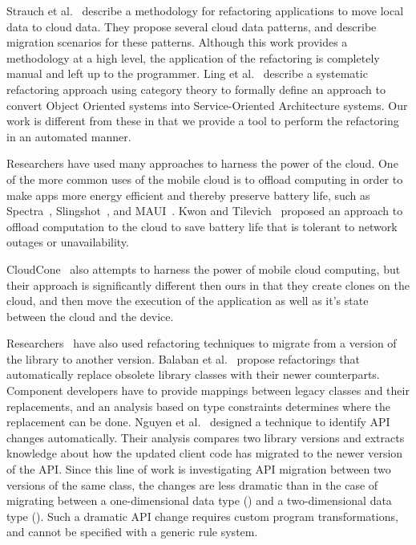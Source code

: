 \documentclass[article]{sigplanconf}
\begin{document}
Strauch et al.~\cite{strauchmigrating} describe a methodology for refactoring applications to move local data to cloud data. They propose several cloud data patterns, and describe migration scenarios for these patterns. Although this work provides a methodology at a high level, the application of the refactoring is completely manual and left up to the programmer. 
Ling et al.~\cite{ling2010refactoring} describe a systematic refactoring approach 
using category theory to formally define an approach to convert Object Oriented systems 
into Service-Oriented Architecture systems. 
Our work is different from these in that we provide a tool to perform the refactoring in an automated manner.

Researchers have used many approaches to harness the power of the cloud.
One of the more common uses of the mobile cloud is to offload computing in order to make apps more energy efficient and thereby preserve battery life, such as Spectra~\cite{flinn2002balancing}, Slingshot~\cite{su2005slingshot}, and MAUI~\cite{cuervo2010maui}.  
Kwon and Tilevich~\cite{kwon2012energy} proposed an approach to offload computation to the cloud to save battery life that is tolerant to network outages or unavailability.

CloudCone~\cite{chun2011clonecloud} also attempts to harness the power of mobile cloud computing, but their approach is significantly different then ours in that they create clones on the cloud, and then move the execution of the application as well as it's state between the cloud and the device.  

Researchers~\cite{BalabanTF05,Nguyen2010} have also used refactoring techniques to migrate from a version of the library to another version. Balaban et al.~\cite{BalabanTF05} propose
refactorings that automatically replace obsolete library classes with their newer counterparts. Component developers have to provide mappings between legacy classes and their replacements, and an analysis based on type constraints determines where the replacement can be done. Nguyen et al.~\cite{Nguyen2010} designed a technique to identify API changes automatically. Their analysis compares two library versions and extracts knowledge about how the updated client code has migrated to the newer version of the API. 
Since this line of work is investigating API migration between two versions of the same class, the changes are less dramatic than in the case of migrating between a 
one-dimensional data type (\NC) and a two-dimensional data type (\CDT). Such a dramatic API change requires custom program transformations, and cannot be specified with a generic rule system. \\
\end{document}
